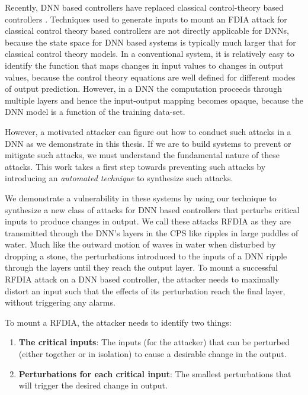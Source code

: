 Recently,  \ac{DNN} based controllers have replaced classical control-theory based controllers \cite{xiang18} \cite{Kocic2019} \cite{bechtel2017deeppicar}.  
Techniques used to generate inputs to mount an FDIA attack for classical control theory based controllers are not directly applicable for DNNs, because the state space for DNN based systems is typically much larger that for classical control theory models. 
In a conventional system, it is relatively easy to identify the function that maps changes in input values to changes in output values, because the control theory equations are well defined for different modes of output prediction.
However, in a \ac{DNN} the computation proceeds through multiple layers and hence the input-output mapping becomes opaque, because the \ac{DNN} model is a function of the training data-set.

However, a motivated attacker can figure out how to conduct such attacks in a \ac{DNN} as we demonstrate in this thesis. 
If we are to build systems to prevent or mitigate such attacks, we must understand the fundamental nature of these attacks. 
This work takes a first step towards preventing such attacks by introducing an {\em automated technique} to synthesize such attacks. 

We demonstrate a vulnerability in these systems by using our technique to synthesize a new class of attacks for DNN based controllers that perturbs critical inputs to produce changes in output. 
We call these attacks \ac{RFDIA} as they are transmitted through the DNN's layers in the CPS like ripples in large puddles of water. 
Much like the outward motion of waves in water when disturbed by dropping a stone, the perturbations introduced to the inputs of a DNN ripple through the layers until they reach the output layer. 
To mount a successful \ac{RFDIA} attack on a DNN based controller, the attacker needs to maximally distort an input such that the effects of its perturbation reach the final layer, without triggering any alarms. 

To mount a \ac{RFDIA}, the attacker needs to identify two things: 
\begin{enumerate}
	\item \textbf{The critical inputs}: The inputs (for the attacker) that can be perturbed (either together or in isolation) to cause a desirable change in the output.
	\item \textbf{Perturbations for each critical input}: The smallest perturbations that will trigger the desired change in output. 
\end{enumerate}


